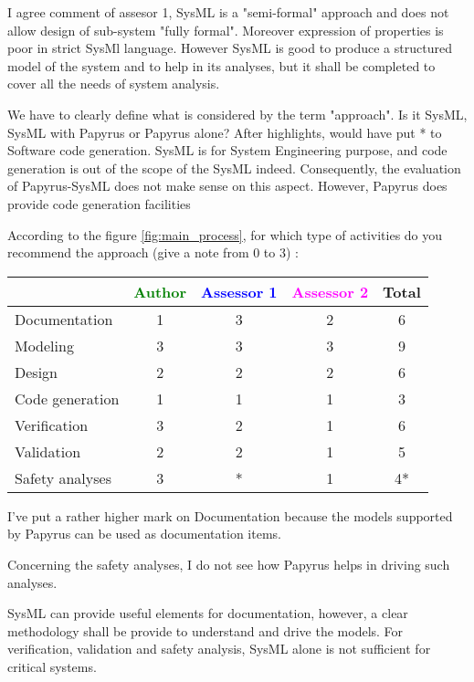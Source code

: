 \begin{assessor2}
I agree comment of assesor 1, SysML is a "semi-formal" approach and does not allow design of sub-system "fully formal". Moreover expression of properties is poor in strict SysMl language.
However SysML is good to produce a structured model of the system  and to help  in its analyses, but it shall be completed to cover all the needs of system analysis.
\end{assessor2}

\begin{author_comment}
We have to clearly define what is considered by the term "approach". Is it SysML, SysML with Papyrus or Papyrus alone?
After highlights, would have put * to Software code generation. SysML is for System Engineering purpose, and code generation is out of the scope of the SysML indeed. Consequently, the evaluation of Papyrus-SysML does not make sense on this aspect. However, Papyrus does provide code generation facilities
\end{author_comment}

According to the figure \ref{fig:main_process}, for which type of activities do you recommend the approach (give a note from 0 to 3) :

\begin{tabular}{|l | c | c | c | c|}
\hline
& \textcolor{green}{Author} & \textcolor{blue}{Assessor 1} & \textcolor{magenta}{Assessor 2} & Total \\
\hline
Documentation & 1 & 3 & 2 & 6 \\
\hline
Modeling & 3 &  3 & 3 & 9 \\
\hline
Design & 2 &  2 & 2 & 6 \\
\hline
Code generation & 1 &  1 & 1 & 3 \\
\hline
Verification & 3 &  2 & 1 & 6 \\
\hline
Validation & 2 &  2 & 1 & 5 \\
\hline
Safety analyses & 3 & * & 1 & 4* \\
\hline
\end{tabular}

\begin{assessor1}
I've put a rather higher mark on Documentation because the models supported by Papyrus can be used as documentation items. 

Concerning the safety analyses, I do not see how Papyrus helps in driving such analyses. 
\end{assessor1}

\begin{assessor2}
SysML can provide useful elements for documentation, however, a clear methodology shall be provide to understand and drive the models. For verification, validation and safety analysis, SysML alone is not sufficient for critical systems. 
\end{assessor2}

